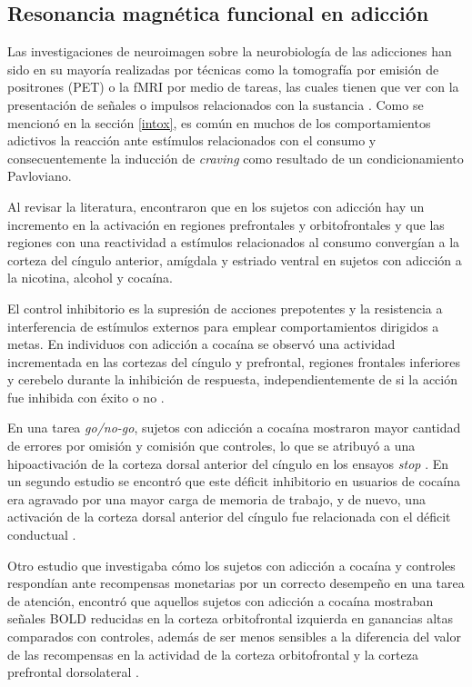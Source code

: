 \subsection{Resonancia magnética funcional en adicción}
Las investigaciones de neuroimagen sobre la neurobiología de las adicciones han sido en su mayoría realizadas por técnicas como la tomografía por emisión de positrones (PET) o la fMRI por medio de tareas, las cuales tienen que ver con la presentación de señales o impulsos relacionados con la sustancia \parencite{Jasinska2014}.
Como se mencionó en la sección \ref{intox}, es común en muchos de los comportamientos adictivos la reacción ante estímulos relacionados con el consumo y consecuentemente la inducción de \textit{craving} como resultado de un condicionamiento Pavloviano.\par
Al revisar la literatura, \textcite{Suckling2017} encontraron que en los sujetos con adicción hay un incremento en la activación en regiones prefrontales y orbitofrontales y que las regiones con una reactividad a estímulos relacionados al consumo convergían a la corteza del cíngulo anterior, amígdala y estriado ventral en sujetos con adicción a la nicotina, alcohol y cocaína. \par
El control inhibitorio es la supresión de acciones prepotentes y la resistencia a interferencia de estímulos externos para emplear comportamientos dirigidos a metas.
En individuos con adicción a cocaína se observó una actividad incrementada en las cortezas del cíngulo y prefrontal, regiones frontales inferiores y cerebelo durante la inhibición de respuesta, independientemente de si la acción fue inhibida con éxito o no \parencite{Suckling2017}.\par
En una tarea \textit{go/no-go}, sujetos con adicción a cocaína mostraron mayor cantidad de errores por omisión y comisión que controles, lo que se atribuyó a una hipoactivación de la corteza dorsal anterior del cíngulo en los ensayos \textit{stop} \parencite{Kaufman2003}.
En un segundo estudio se encontró que este déficit inhibitorio en usuarios de cocaína era agravado por una mayor carga de memoria de trabajo, y de nuevo, una activación de la corteza dorsal anterior del cíngulo fue relacionada con el déficit conductual \parencite{Hester2004}.\par
Otro estudio que investigaba cómo los sujetos con adicción a cocaína y controles respondían ante recompensas monetarias por un correcto desempeño en una tarea de atención, encontró que aquellos sujetos con adicción a cocaína mostraban señales BOLD reducidas en la corteza orbitofrontal izquierda en ganancias altas comparados con controles, además de ser menos sensibles a la diferencia del valor de las recompensas en la actividad de la corteza orbitofrontal y la corteza prefrontal dorsolateral \parencite{Goldstein2007}. \par
